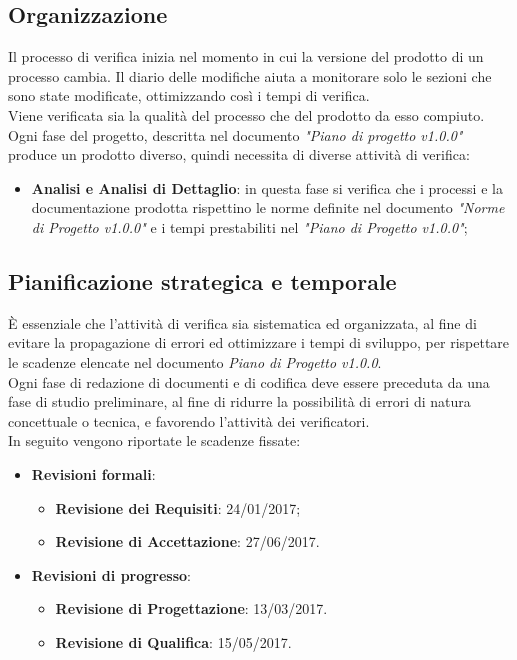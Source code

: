 \documentclass[12pt,a4paper,titlepage]{article}
\begin{document}
	\subsection{Organizzazione}
	Il processo di verifica inizia nel momento in cui la versione del prodotto di un processo cambia. Il diario delle modifiche aiuta a monitorare solo le sezioni che sono state modificate, ottimizzando così i tempi di verifica.\\
	Viene verificata sia la qualità del processo che del prodotto da esso compiuto.\\
	Ogni fase del progetto, descritta nel documento \textit{"Piano di progetto v1.0.0"} produce un prodotto diverso, quindi necessita di diverse attività di verifica:
	\begin{itemize}
		\item \textbf{Analisi e Analisi di Dettaglio}: in questa fase si verifica che i processi e la documentazione prodotta rispettino le norme definite nel documento \textit{"Norme di Progetto v1.0.0"} e i tempi prestabiliti nel \textit{"Piano di Progetto v1.0.0"};
	\end{itemize}

	\subsection{Pianificazione strategica e temporale}
	È essenziale che l'attività di verifica sia sistematica ed organizzata, al fine di evitare la propagazione di errori ed ottimizzare i tempi di sviluppo, per rispettare le scadenze elencate nel documento \textit{Piano di Progetto v1.0.0}.\\
	Ogni fase di redazione di documenti e di codifica deve essere preceduta da una fase di studio preliminare, al fine di ridurre la possibilità di errori di natura concettuale o tecnica, e favorendo l'attività dei verificatori.\\
	In seguito vengono riportate le scadenze fissate:
	\begin{itemize}
		\item \textbf{Revisioni formali}:
			\begin{itemize}
				\item \textbf{Revisione dei Requisiti}: 24/01/2017;
				\item \textbf{Revisione di Accettazione}: 27/06/2017.
			\end{itemize}
		\item \textbf{Revisioni di progresso}:
			\begin{itemize}
				\item \textbf{Revisione di Progettazione}: 13/03/2017.
				\item \textbf{Revisione di Qualifica}: 15/05/2017.
			\end{itemize}
	\end{itemize}
	
\end{document}
